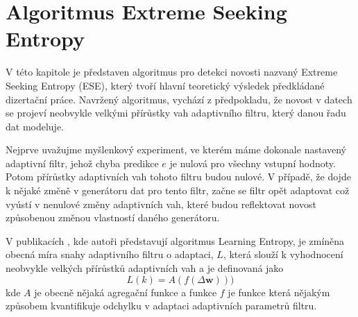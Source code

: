\chapter{Algoritmus Extreme Seeking Entropy}
V této kapitole je představen algoritmus pro detekci novosti nazvaný Extreme Seeking Entropy (ESE), který tvoří hlavní teoretický výsledek předkládané dizertační práce. Navržený algoritmus, vychází z předpokladu, že novost v datech se projeví neobvykle velkými přírůstky vah adaptivního filtru, který danou řadu dat modeluje.
\par Nejprve uvažujme myšlenkový experiment, ve kterém máme dokonale nastavený adaptivní filtr, jehož chyba predikce $e$ je nulová pro všechny vstupní hodnoty. Potom přírůstky adaptivních vah tohoto filtru budou nulové. V případě, že dojde k nějaké změně v generátoru dat pro tento filtr, začne se filtr opět adaptovat což vyústí v nenulové změny adaptivních vah, které budou reflektovat novost způsobenou změnou vlastností daného generátoru.
\par
V publikacích \cite{ivoLE1,ivoLE2}, kde autoři představují algoritmus Learning Entropy, je zmíněna obecná míra snahy adaptivního filtru o adaptaci, $L$, která slouží k vyhodnocení neobvykle velkých přírůstků adaptivních vah a je definovaná jako
\begin{equation}
L(k)=A(f(\Delta \textbf{w})))
\end{equation}
kde $A$ je obecně nějaká agregační funkce a funkce $f$ je funkce která nějakým způsobem kvantifikuje odchylku v adaptaci adaptivních parametrů filtru.

